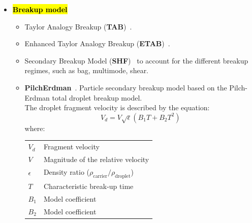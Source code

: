\documentclass[12pt]{article}
\begin{document}
\begin{itemize}
    \item \textbf{\hl{Breakup model}}
    \begin{itemize}
        \item Taylor Analogy Breakup (\textbf{TAB})~\cite{o1987tab}.
        \item Enhanced Taylor Analogy Breakup (\textbf{ETAB})~\cite{tanner1997liquid,tanner1998simulation}.
        \item Secondary Breakup Model (\textbf{SHF})~\cite{schmehl2000cfd} to account for the different breakup regimes, such as bag, multimode, shear.
        \item \textbf{PilchErdman}~\cite{pilch1987use}. Particle secondary breakup model based on the Pilch-Erdman total droplet breakup model.\\
        The droplet fragment velocity is described by the equation:
        \[
            V_d = V \sqrt{\epsilon}(B_1 T + B_2 T^2)
        \]
        where:\\
        
        \begin{tabular}{lp{8cm}}
            $V_d$      & Fragment velocity \\
            $V$        & Magnitude of the relative velocity \\
            $\epsilon$ & Density ratio ($\rho_{\text{carrier}} / \rho_{\text{droplet}}$) \\
            $T$        & Characteristic break-up time \\
            $B_1$      & Model coefficient \\
            $B_2$      & Model coefficient \\
        \end{tabular}\\
        

\end{itemize}
\end{itemize}
\end{document}
